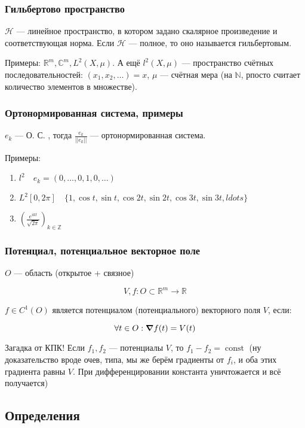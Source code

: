 \documentclass{article}
\DeclareMathOperator{\const}{const}
\begin{document}
\subsubsection{Гильбертово пространство}

$\mathcal{H}$ --- линейное пространство, в котором задано скалярное произведение и соответствующая норма. Если $\mathcal{H}$ --- полное, то оно называется гильбертовым.

Примеры: $\mathbb{R}^m, \mathbb{C}^m, L^2(X, \mu)$. А ещё $l^2(X, \mu)$ --- пространство счётных последовательностей: $(x_1, x_2, \ldots) = x$, $\mu$ --- счётная мера (на $\mathbb{N}$, рпосто считает количество элементов в множестве).

\subsubsection{Ортонормированная система, примеры}

${e_k}$ --- О. С. , тогда ${\frac{e_k}{|| e_k ||}}$ --- ортонормированная система.

Примеры: 

\begin{enumerate}
    \item $l^2 \quad e_k = (0, \ldots, 0, 1, 0, \ldots)$
    \item $L^2[0, 2\pi] \quad \{1, \cos t, \sin t, \cos 2t, \sin 2t, \cos 3t, \sin 3t, ldots\}$
    \item $\left(\frac{e^{ikt}}{\sqrt{2\pi}}\right)_{k \in \mathbb{Z}}$
\end{enumerate}

\subsubsection{Потенциал, потенциальное векторное поле}
$O$ --- область (открытое + связное)

\[V, f: O \subset \mathbb{R}^m \rightarrow \mathbb{R}\]

$f \in C^1(O)$ является потенциалом (потенциального) векторного поля $V$, если:

\[\forall t \in O: \grad f(t) = V(t)\]

Загадка от КПК! Если $f_1, f_2$ --- потенциалы $V$, то $f_1 - f_2 = \const$ (ну доказательство вроде очев, типа, мы же берём градиенты от $f_i$, и оба этих градиента равны $V$. При дифференцировании константа уничтожается и всё получается)

\newpage

\subsection{Определения}
\end{document}
